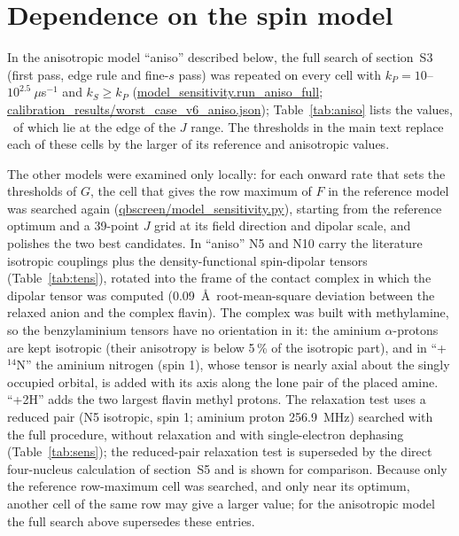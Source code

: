 \documentclass[11pt]{article}
\begin{document}
\begin{table}[h]
\caption{$F(k_S,k_P)$ (\%). Rates in $\mu$s$^{-1}$.}
\label{tab:map}
\centering
\resizebox{\textwidth}{!}{}
\end{table}

\section{Dependence on the spin model}
In the anisotropic model ``aniso'' described below, the full search of
section~S3 (first pass, edge rule and fine-$s$ pass) was repeated on every cell
with $k_P = 10$--$10^{2.5}~\mu$s$^{-1}$ and $k_S\ge k_P$
(\url{model_sensitivity.run_aniso_full};
\url{calibration_results/worst_case_v6_aniso.json}); Table~\ref{tab:aniso}
lists the values, \nAnisoEdge\ of which lie at the edge of the $J$ range. The
thresholds in the main text replace each of these cells by the larger of its
reference and anisotropic values.

The other models were examined only locally: for each onward rate that sets the
thresholds of $G$, the cell that gives the row maximum of $F$ in the reference
model was searched again (\url{qbscreen/model_sensitivity.py}), starting from
the reference optimum and a 39-point $J$ grid at its field direction and dipolar scale, and
polishes the two best candidates. In ``aniso'' N5 and N10 carry the
literature isotropic couplings plus the density-functional spin-dipolar tensors
(Table~\ref{tab:tens}), rotated into the frame of the contact complex in
which the dipolar tensor was computed (0.09~\AA\ root-mean-square deviation
between the relaxed anion and the complex flavin). The complex was built with
methylamine, so the benzylaminium tensors have no orientation in it: the
aminium $\alpha$-protons are kept isotropic (their anisotropy is below 5\,\% of
the isotropic part), and in ``+$^{14}$N'' the aminium nitrogen (spin 1), whose
tensor is nearly axial about the singly occupied orbital, is added with its
axis along the lone pair of the placed amine. ``+2H'' adds the two largest
flavin methyl protons. The relaxation test uses a
reduced pair (N5 isotropic, spin 1; aminium proton 256.9~MHz) searched with the
full procedure, without relaxation and with single-electron dephasing
(Table~\ref{tab:sens}); the reduced-pair relaxation test is superseded by the
direct four-nucleus calculation of section~S5 and is shown for comparison.
Because only the reference row-maximum cell was searched, and only near its
optimum, another cell of the same row may give a larger value; for the
anisotropic model the full search above supersedes these entries.
\end{document}

